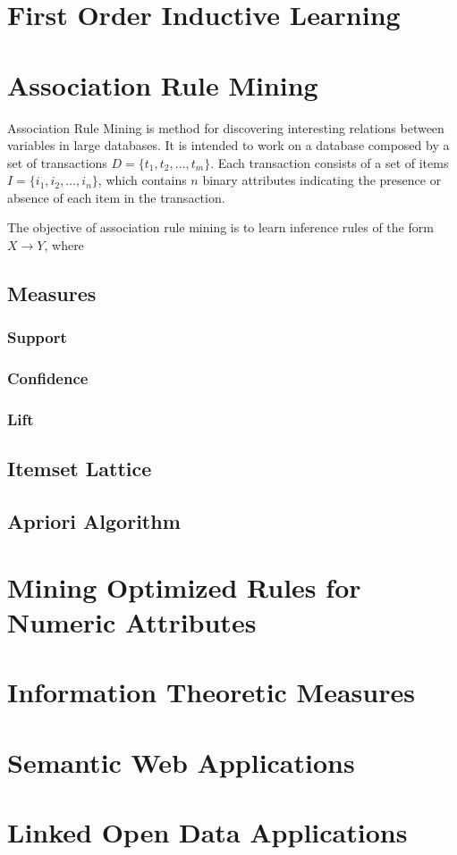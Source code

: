 \section{First Order Inductive Learning}
\cite{DBLP:journals/ml/Quinlan9}
\cite{DBLP:conf/ecml/QuinlanC93}

\section{Association Rule Mining}
\cite{Agrawal:1993:MAR:170036.170072}

Association Rule Mining is method for discovering interesting relations between variables in large databases. It is
intended to work on a database composed by a set of transactions $D=\{t_1,t_2,\ldots,t_m\}$. Each transaction consists
of a set of items $I=\{i_1,i_2,\ldots,i_n\}$, which contains $n$ binary attributes indicating the presence or
absence of each item in the transaction.

The objective of association rule mining is to learn inference rules of the form $X \rightarrow Y$, where 



\subsection{Measures}
\subsubsection{Support}
\subsubsection{Confidence}
\subsubsection{Lift}
\subsection{Itemset Lattice}
\subsection{Apriori Algorithm}

\section{Mining Optimized Rules for Numeric Attributes}

\cite{Brin99miningoptimized}

\section{Information Theoretic Measures}

\cite{DBLP:conf/sac/CaldersGPR09}

\section{Semantic Web Applications}
\section{Linked Open Data Applications}